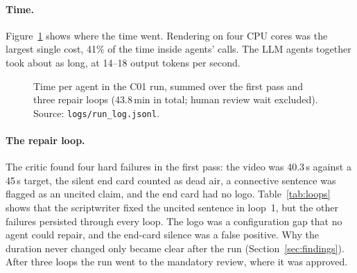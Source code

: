 \documentclass[twoside,11pt]{article}
\begin{document}
\paragraph{Time.} Figure~\ref{fig:time} shows where the time went. Rendering on four CPU cores was the largest single cost, 41\% of the time inside agents' calls. The LLM agents together took about as long, at 14--18 output tokens per second.

\begin{figure}[t]
\centering
{}
\caption{Time per agent in the C01 run, summed over the first pass and three repair loops (43.8\,min in total; human review wait excluded). Source: \texttt{logs/run\_log.jsonl}.}
\label{fig:time}
\end{figure}

\paragraph{The repair loop.} The critic found four hard failures in the first pass: the video was 40.3\,s against a 45\,s target, the silent end card counted as dead air, a connective sentence was flagged as an uncited claim, and the end card had no logo. Table~\ref{tab:loops} shows that the scriptwriter fixed the uncited sentence in loop~1, but the other failures persisted through every loop. The logo was a configuration gap that no agent could repair, and the end-card silence was a false positive. Why the duration never changed only became clear after the run (Section~\ref{sec:findings}). After three loops the run went to the mandatory review, where it was approved.
\end{document}
